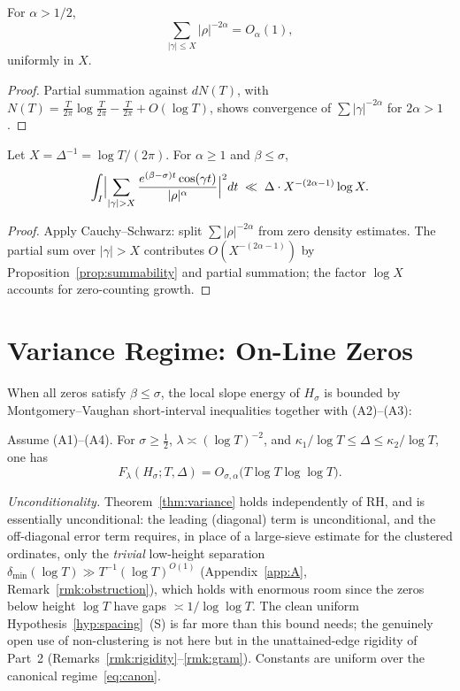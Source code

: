 \begin{proposition}[Summability]\label{prop:summability}
For $\alpha > 1/2$,
\[
\sum_{|\gamma|\le X} |\rho|^{-2\alpha} = O_{\alpha}(1),
\]
uniformly in $X$.
\end{proposition}

\begin{proof}
Partial summation against $dN(T)$, with
$N(T)=\frac{T}{2\pi}\log\frac{T}{2\pi} - \frac{T}{2\pi}+O(\log T)$,
shows convergence of $\sum |\gamma|^{-2\alpha}$ for $2\alpha>1$.
\end{proof}

\begin{lemma}\label{lem:high-freq}
Let $X=\Delta^{-1}=\log T/(2\pi)$. For $\alpha\ge 1$ and $\beta\le\sigma$,
\[
\int_I \Bigl|\sum_{|\gamma|>X}
\frac{e^{(\beta-\sigma)t}\cos(\gamma t)}{|\rho|^\alpha}\Bigr|^2 dt
\;\ll\; \Delta \cdot X^{-(2\alpha-1)}\log X.
\]
\end{lemma}

\begin{proof}
Apply Cauchy--Schwarz: split $\sum |\rho|^{-2\alpha}$ from zero density
estimates.  The partial sum over $|\gamma|>X$ contributes $O(X^{-(2\alpha-1)})$
by Proposition~\ref{prop:summability} and partial summation;
the factor $\log X$ accounts for zero-counting growth.
\end{proof}

\section{Variance Regime: On-Line Zeros}

When all zeros satisfy $\beta\le\sigma$, the local slope energy of $H_\sigma$
is bounded by Montgomery–Vaughan short-interval inequalities together with
(A2)–(A3):

\begin{theorem}\label{thm:variance}
Assume \textup{(A1)–(A4)}.
For $\sigma\ge\tfrac12$, $\lambda\asymp(\log T)^{-2}$, and
$\kappa_1/\log T \le \Delta \le \kappa_2/\log T$, one has
\begin{equation}
F_\lambda(H_\sigma;T,\Delta)
  = O_{\sigma,\alpha}\!\bigl(T\log T\log\log T\bigr).
\label{eq:variance}
\end{equation}
\end{theorem}

\noindent\emph{Unconditionality.}
Theorem~\ref{thm:variance} holds independently of RH, and is essentially
unconditional: the leading (diagonal) term is unconditional, and the off-diagonal
error term requires, in place of a large-sieve estimate for the clustered
ordinates, only the \emph{trivial} low-height separation
$\delta_{\min}(\log T)\gg T^{-1}(\log T)^{O(1)}$
(Appendix~\ref{app:A}, Remark~\ref{rmk:obstruction}), which holds with enormous
room since the zeros below height $\log T$ have gaps $\asymp1/\log\log T$.  The
clean uniform Hypothesis~\ref{hyp:spacing}~(S) is far more than this bound
needs; the genuinely open use of non-clustering is not here but in the
unattained-edge rigidity of Part~2 (Remarks~\ref{rmk:rigidity}--\ref{rmk:gram}).
Constants are uniform over the canonical regime~\eqref{eq:canon}.

